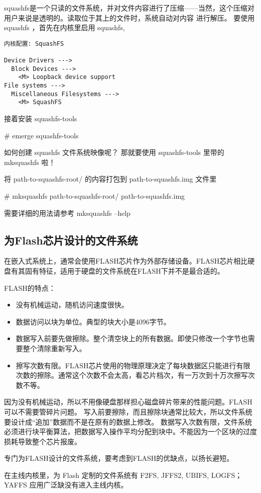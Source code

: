 squashfs是一个只读的文件系统，并对文件内容进行了压缩——当然，这个压缩对用户来说是透明的。读取位于其上的文件时，系统自动对内容
进行解压。 要使用 squashfs ，首先在内核里启用 squashfs,

\begin{verbatim}
内核配置: SquashFS

Device Drivers --->
  Block Devices --->
    <M> Loopback device support
File systems --->
  Miscellaneous Filesystems --->
    <M> SquashFS

\end{verbatim}

接着安装 squashfs-tools

\begin{code}
\# emerge squashfs-tools
\end{code}

如何创建 squashfs 文件系统映像呢？ 那就要使用 squashfs-tools 里带的 mksquashfs 啦！

\begin{example}{将 path-to-squashfs-root/ 的内容打包到 path-to-squashfs.img 文件里}
\begin{code}
\# mksquashfs path-to-squashfs-root/  path-to-squashfs.img 
\end{code}
\end{example}

需要详细的用法请参考 mksquashfs --help

\subsection{为Flash芯片设计的文件系统}

在嵌入式系统上，通常会使用FLASH芯片作为外部存储设备。FLASH芯片相比硬盘有其固有特征，适用于硬盘的文件系统在FLASH下并不是最合适的。

FLASH的特点：

\begin{itemize}
\item 没有机械运动，随机访问速度很快。
\item 数据访问以块为单位。典型的块大小是4096字节。
\item 数据写入前要先做擦除。整个清空块上的所有数据。即使只修改一个字节也需要整个清除重新写入。
\item 擦写次数有限。FLASH芯片使用的物理原理决定了每块数据区只能进行有限次数的擦除。通常这个次数不会太高，看芯片档次，有一万次到十万次擦写次数不等。
\end{itemize}

因为没有机械运动，所以不用像硬盘那样担心磁盘碎片带来的性能问题。FLASH可以不需要管碎片问题。
写入前要擦除，而且擦除块通常比较大，所以文件系统要设计成“追加”数据而不是在原有的数据上修改。
数据写入次数有限，文件系统必须进行块平衡算法，把数据写入操作平均分配到块中。不能因为一个区块的过度损耗导致整个芯片报废。

专门为FLASH设计的文件系统，要考虑到FLASH的优缺点，以扬长避短。

在主线内核里，为 Flash 定制的文件系统有 F2FS, JFFS2, UBIFS, LOGFS；
YAFFS 应用广泛缺没有进入主线内核。
